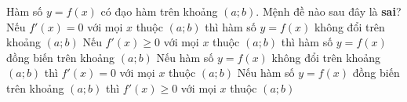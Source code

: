 \begin{ex}%
	Hàm số $y=f(x)$ có đạo hàm trên khoảng $(a;b)$. Mệnh đề nào sau đây là \textbf{sai}?
	\choice
	{Nếu $f'(x)=0$ với mọi $x$ thuộc $(a;b)$ thì hàm số $y=f(x)$ không đổi trên khoảng $(a;b)$}
	{\True Nếu $f'(x)\geq 0$ với mọi $x$ thuộc $(a;b)$ thì hàm số $y=f(x)$ đồng biến trên khoảng $(a;b)$}
	{Nếu hàm số $y=f(x)$ không đổi trên khoảng $(a;b)$ thì $f'(x)=0$ với mọi $x$ thuộc $(a;b)$}
	{Nếu hàm số $y=f(x)$ đồng biến trên khoảng $(a;b)$ thì $f'(x)\geq 0$ với mọi $x$ thuộc $(a;b)$}
\end{ex}
